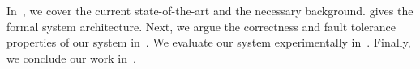 In~,
we cover the current state-of-the-art and the necessary background.
 gives the formal system architecture.
Next, we argue the correctness and fault tolerance properties of our system in~.
We evaluate our system experimentally in~.
Finally, we conclude our work in~.